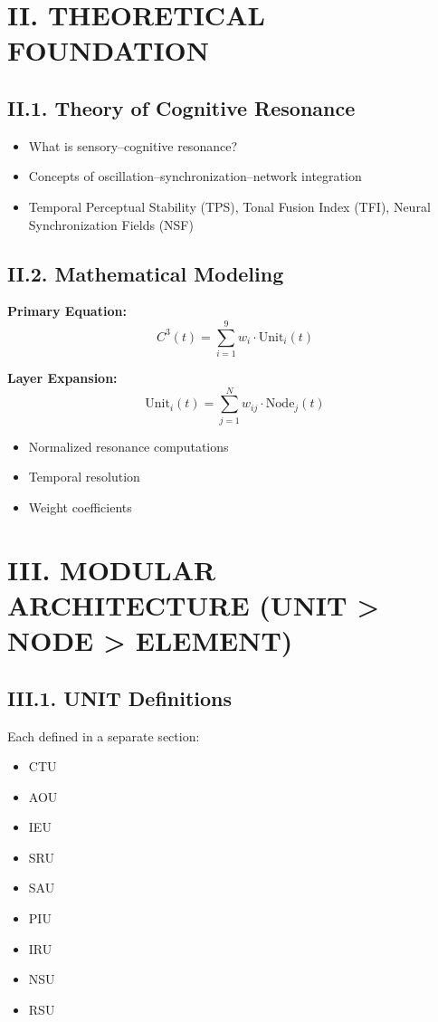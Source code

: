\section*{II. THEORETICAL FOUNDATION}

\subsection*{II.1. Theory of Cognitive Resonance}

\begin{itemize}
    \item What is sensory–cognitive resonance?
    \item Concepts of oscillation–synchronization–network integration
    \item Temporal Perceptual Stability (TPS), Tonal Fusion Index (TFI), Neural Synchronization Fields (NSF)
\end{itemize}

\subsection*{II.2. Mathematical Modeling}

\textbf{Primary Equation:}
\[
C^3(t) = \sum_{i=1}^{9} w_i \cdot \text{Unit}_i(t)
\]

\textbf{Layer Expansion:}
\[
\text{Unit}_i(t) = \sum_{j=1}^{N} w_{ij} \cdot \text{Node}_j(t)
\]

\begin{itemize}
    \item Normalized resonance computations
    \item Temporal resolution
    \item Weight coefficients
\end{itemize}

\section*{III. MODULAR ARCHITECTURE (UNIT > NODE > ELEMENT)}

\subsection*{III.1. UNIT Definitions}

Each defined in a separate section:

\begin{itemize}
    \item  CTU
    \item  AOU
    \item  IEU
    \item  SRU
    \item  SAU
    \item  PIU
    \item  IRU
    \item  NSU
    \item  RSU
\end{itemize}

